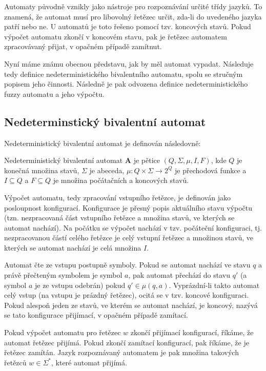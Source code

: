 \documentclass[a4paper,10pt]{article}
\begin{document}
Automaty původně vznikly jako nástroje pro rozpoznávání určité třídy jazyků. To znamená, že automat musí pro libovolný řetězec určit, zda-li do uvedeného jazyka patří nebo ne. U automatů je toto řešeno pomocí tzv. koncových stavů. Pokud výpočet automatu zkončí v koncovém stavu, pak je řetězec automatem zpracovávaný přijat, v opačném případě zamítnut.

Nyní máme známu obecnou představu, jak by měl automat vypadat. Následuje tedy definice nedeterministického bivalentního automatu, spolu se stručným popisem jeho činnosti. Následně je pak odvozena definice nedeterministického fuzzy automatu a jeho výpočtu.


\subsection{Nedeterminstický bivalentní automat}
Nedeterministický bivalentní automat je definován následovně:

\begin{definition}\label{def-NedBivAut}
 Nedeterministický bivalentní automat $\mathbf{A}$ je pětice $(Q, \Sigma, \mu, I, F)$, kde $Q$ je konečná množina stavů, $\Sigma$ je abeceda, $\mu: Q \times \Sigma \rightarrow 2^Q$ je přechodová funkce a $I \subseteq Q$ a $F \subseteq Q$ je množina počátačních a koncových stavů.
\end{definition}

Výpočet automatu, tedy zpracování vstupního řetězce, je definován jako posloupnost konfigurací. Konfigurace je přesný popis aktuálního stavu výpočtu (tzn. nezpracovaná část vstupního řetězce a množina stavů, ve kterých se automat nachází). Na počátku se výpočet nachází v tzv. počáteční konfiguraci, tj. nezpracovanou částí celého řetězce je celý vstupní řetězec a množinou stavů, ve kterých se automat nachází je celá množina $I$.

Automat čte ze vstupu postupně symboly. Pokud se automat nachází ve stavu $q$ a právě přečteným symbolem je symbol $a$, pak automat přechází do stavu $q'$ (a symbol $a$ je ze vstupu odebrán) pokud $q' \in \mu(q, a)$. Vyprázdní-li takto automat celý vstup (na vstupu je prázdný řetězec), ocitá se v tzv. koncové konfiguraci. Pokud alespoň jeden ze stavů, ve kterém se automat nachází, je koncový, nazývá se tato konfigurace přijímací, v opačném případě zamítací.

Pokud výpočet automatu pro řetězec $w$ zkončí přijímací konfigurací, říkáme, že automat řetězec přijímá. Pokud zkončí zamítací konfigurací, pak říkáme, že je řetězec zamítán. Jazyk rozpoznávaný automatem je pak množina takových řetězců $w \in \Sigma^*$, které automat přijímá.
\end{document}
